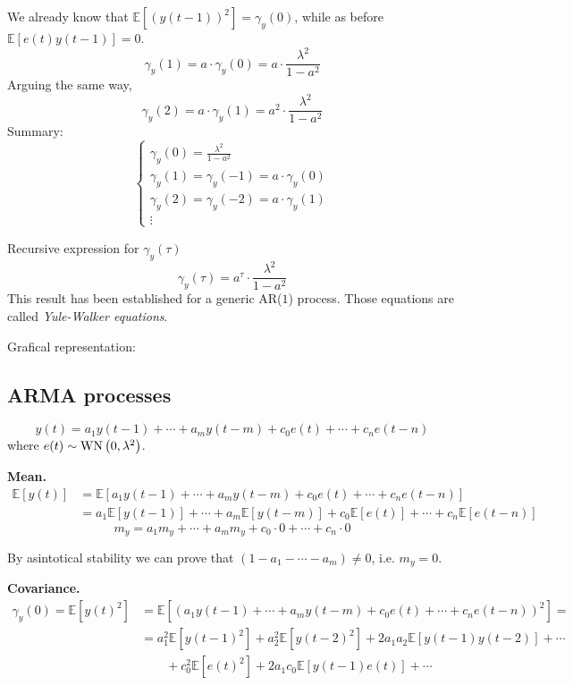 We already know that $\mathbb{E}\left[(y(t-1))^{2}\right]=\gamma_{y}(0)$, while as before $\mathbb{E}[e(t) y(t-1)]=0$.
$$
\gamma_{y}(1)=a \cdot \gamma_{y}(0)=a \cdot \frac{\lambda^{2}}{1-a^{2}}
$$
Arguing the same way,
\[
	\gamma_{y}(2)=a \cdot \gamma_{y}(1)=a^{2} \cdot \frac{\lambda^{2}}{1-a^{2}}
\]
Summary:
\begin{equation*}
	\begin{cases}
		\gamma_{y}(0)=\frac{\lambda^{2}}{1-a^{2}} \\
		\gamma_{y}(1)=\gamma_{y}(-1)=a \cdot \gamma_{y}(0) \\
		\gamma_{y}(2)=\gamma_{y}(-2)=a \cdot \gamma_{y}(1) \\
		\vdots
	\end{cases}
\end{equation*}

Recursive expression for $\gamma_{y}(\tau)$
$$
	\gamma_{y}(\tau)=a^{\tau} \cdot \frac{\lambda^{2}}{1-a^{2}}
$$
This result has been established for a generic AR($1$) process.
Those equations are called \emph{Yule-Walker equations}.

Grafical representation:



\subsection{ARMA processes}
$$
y(t)=a_{1} y(t-1)+\cdots+a_{m} y(t-m)+c_{0} e(t)+\cdots+c_{n} e(t-n)
$$
where $e(t) \sim \operatorname{WN}\left(0, \lambda^{2}\right)$.

\textbf{Mean.}
\begin{align*}
	\mathbb{E}[y(t)] &=\mathbb{E}\left[a_{1} y(t-1)+\cdots+a_{m} y(t-m)+c_{0} e(t)+\cdots+c_{n} e(t-n)\right] \\
	&=a_{1} \mathbb{E}[y(t-1)]+\cdots+a_{m} \mathbb{E}[y(t-m)]+c_{0} \mathbb{E}[e(t)]+\cdots+c_{n} \mathbb{E}[e(t-n)]
\end{align*}
$$
m_{y}=a_{1} m_{y}+\cdots+a_{m} m_{y}+c_{0} \cdot 0+\cdots+c_{n} \cdot 0
$$

By asintotical stability we can prove that $(1-a_1-\cdots-a_m)\neq0$, i.e. $m_{y}=0$.

\textbf{Covariance.}
\begin{align*}
	\gamma_{y}(0) = \mathbb{E}\left[y(t)^{2}\right]&=\mathbb{E}\left[\left(a_{1} y(t-1)+\cdots+a_{m} y(t-m)+c_{0} e(t)+\cdots+c_{n} e(t-n)\right)^{2}\right]=\\
	&= a_{1}^{2} \mathbb{E}\left[y(t-1)^{2}\right]+a_{2}^{2} \mathbb{E}\left[y(t-2)^{2}\right]+2 a_{1} a_{2} \mathbb{E}[y(t-1) y(t-2)]+\cdots \\
	&\qquad+c_{0}^{2} \mathbb{E}\left[e(t)^{2}\right]+2 a_{1} c_{0} \mathbb{E}[y(t-1) e(t)]+\cdots
\end{align*}

